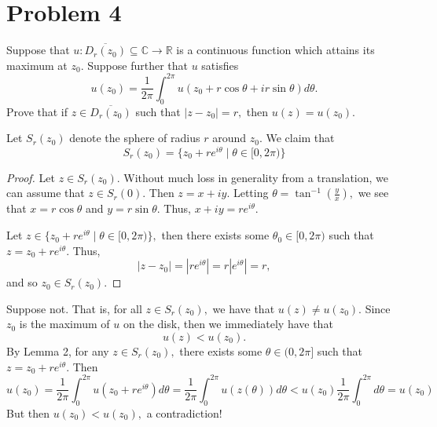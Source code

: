 \documentclass[11pt]{article}
\newcommand{\bbC}{\mathbb{C}}
\newcommand{\bbR}{\mathbb{R}}
\begin{document}
\newpage
\section*{Problem 4}
\begin{problem}
    Suppose that $u: \overline{D_r(z_0)}\subseteq \bbC \to \bbR$ is a continuous function which attains its maximum at $z_0.$ Suppose further that $u$ satisfies 
    \[u(z_0) = \frac{1}{2\pi}\int_0^{2\pi}u(z_0 + r\cos \theta + ir\sin\theta)d\theta.\] Prove that if $z\in \overline{D_r(z_0)}$ such that $|z - z_0| = r,$ then $u(z) = u(z_0).$
\end{problem}
\begin{solution}
\begin{lemma}
Let $S_r(z_0)$ denote the sphere of radius $r$ around $z_0.$ We claim that
    \[S_r(z_0) = \{z_0 + re^{i\theta} \mid \theta \in [0, 2\pi)\}\]
\end{lemma}
\begin{proof}
    Let $z \in S_r(z_0).$ Without much loss in generality from a translation, we can assume that $z \in S_r(0).$ Then $z = x + iy.$ Letting $\theta = \tan^{-1}(\frac{y}{x}),$ we see that $x = r\cos\theta$ and $y = r\sin\theta.$ Thus, $x + iy = re^{i\theta}.$  

    Let $z \in \{z_0 + re^{i\theta} \mid \theta \in [0, 2\pi)\},$ then there exists some $\theta_0 \in [0,2\pi)$ such that $z = z_0  + re^{i\theta}.$ Thus, 
    \[|z - z_0| = |re^{i\theta}| = r|e^{i\theta}| = r,\] and so $z_0 \in S_r(z_0).$
\end{proof}
Suppose not. That is, for all $z\in S_r(z_0),$ we have that $u(z) \neq u(z_0).$
Since $z_0$ is the maximum of $u$ on the disk, then we immediately have that 
    \[u(z) < u(z_0).\] By Lemma 2, for any $z\in S_r(z_0),$ there exists some $\theta \in (0, 2\pi]$ such that $z = z_0 + re^{i\theta}.$  Then 
    \[u(z_0) =\frac{1}{2\pi}\int_0^{2\pi} u(z_0 + re^{i\theta})d\theta = \frac{1}{2\pi}\int_0^{2\pi}u(z(\theta))d\theta < 
    u(z_0) \frac{1}{2\pi}\int_0^{2\pi}d\theta = u(z_0)\] But then $u(z_0) < u(z_0),$ a contradiction!
\end{solution}

\newpage
\end{document}
